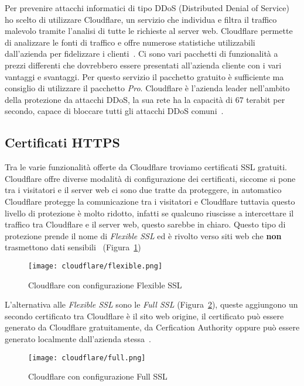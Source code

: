 Per prevenire attacchi informatici di tipo DDoS (Distributed Denial of Service) ho scelto di utilizzare Cloudflare, un servizio che individua e filtra il traffico malevolo tramite l'analisi di tutte le richieste al server web. Cloudflare permette di analizzare le fonti di traffico e offre numerose statistiche utilizzabili dall'azienda per fidelizzare i clienti~\cite{cloudflare-ddos}. Ci sono vari pacchetti di funzionalit\`a a prezzi differenti che dovrebbero essere presentati all'azienda cliente con i vari vantaggi e svantaggi. Per questo servizio il pacchetto gratuito \`e sufficiente ma consiglio di utilizzare il pacchetto \emph{Pro}. Cloudflare \`e l'azienda leader nell'ambito della protezione da attacchi DDoS, la sua rete ha la capacit\`a di 67 terabit per secondo, capace di bloccare tutti gli attacchi DDoS comuni~\cite{cloudflare-research}.

\subsection{Certificati HTTPS}%
\label{sub:certificati}

Tra le varie funzionalit\`a offerte da Cloudflare troviamo certificati SSL gratuiti. Cloudflare offre diverse modalit\`a di configurazione dei certificati, siccome si pone tra i visitatori e il server web ci sono due tratte da proteggere, in automatico Cloudflare protegge la comunicazione tra i visitatori e Cloudflare tuttavia questo livello di protezione \`e molto ridotto, infatti se qualcuno riuscisse a intercettare il traffico tra Cloudflare e il server web, questo sarebbe in chiaro. Questo tipo di protezione prende il nome di \emph{Flexible SSL} ed \`e rivolto verso siti web che \textbf{non} trasmettono dati sensibili~\cite{cloudflare-ssl} (Figura~\ref{fig:flexiblessl})

\begin{figure}[htpb]
    \centering
    \texttt{[image: cloudflare/flexible.png]}
    \caption{Cloudflare con configurazione Flexible SSL}%
    \label{fig:flexiblessl}
\end{figure}

L'alternativa alle \emph{Flexible SSL} sono le \emph{Full SSL} (Figura~\ref{fig:fullssl}), queste aggiungono un secondo certificato tra Cloudflare \`e il sito web origine, il certificato pu\`o essere generato da Cloudflare gratuitamente, da Cerfication Authority oppure pu\`o essere generato localmente dall'azienda stessa~\cite{cloudflare-help}.

\begin{figure}[htpb]
    \centering
    \texttt{[image: cloudflare/full.png]}
    \caption{Cloudflare con configurazione Full SSL}%
    \label{fig:fullssl}
\end{figure}

